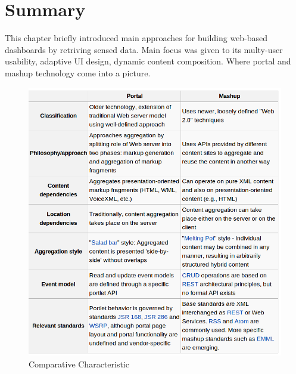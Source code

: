\section{Summary}
This chapter briefly introduced main approaches for building web-based dashboards by retriving sensed data. Main focus was given to its multy-user usability, adaptive UI design, dynamic content composition. Where portal and mashup technology come into a picture. 
\begin{figure}[!ht]
\centering
\includegraphics[scale=0.8]{images/MashupVsPortal.png}   
\caption[Comparative Characteristic of Approaches]{Comparative Characteristic}
\label{img:comparative characteristic}                           
\end{figure}
